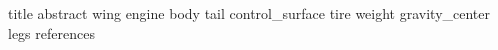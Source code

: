 \documentclass[dvipdfmx, fleqn, uplatex, a4paper]{jsarticle}
\begin{document}
{title}
\newpage
\tableofcontents
\newpage
{abstract}
{wing}
{engine}
{body}
{tail}
{control_surface}
{tire}
{weight}
{gravity_center}
{legs}
\newpage
{references}
\end{document}
